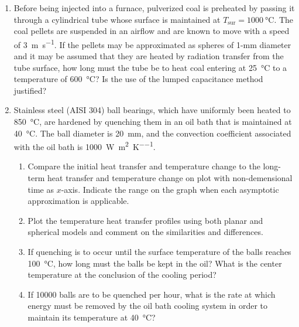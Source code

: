 \documentclass[12pt,letterpaper]{article}
\begin{document}
\begin{enumerate}
    \item Before being injected into a furnace, pulverized coal is preheated by passing it through a cylindrical tube whose surface is maintained at $T_{\mathrm{sur}} = \SI{1000}{\celsius}$.
    The coal pellets are suspended in an airflow and are known to move with a speed of \SI{3}{\meter\per\second}.
       If the pellets may be approximated as spheres of 1-mm diameter and it may be assumed that they are heated by radiation transfer from the tube surface, how long must the tube be to heat coal entering at \SI{25}{\celsius} to a temperature of \SI{600}{\celsius}?
        Is the use of the lumped capacitance method justified?
        
        \item Stainless steel (AISI 304) ball bearings, which have uniformly been heated to \SI{850}{\celsius}, are hardened by quenching them in an oil bath that is maintained at \SI{40}{\celsius}.
        The ball diameter is \SI{20}{\milli\meter}, and the convection coefficient associated with the oil bath is \SI{1000}{\watt\per\square\meter\per\kelvin}.
        \begin{enumerate}
        		\item Compare the initial heat transfer and temperature change to the long-term heat transfer and temperature change on plot with non-demensional time as $x$-axis.
		Indicate the range on the graph when each asymptotic approximation is applicable.
		\item Plot the temperature heat transfer profiles using both planar and spherical models and comment on the similarities and differences. 
        		\item If quenching is to occur until the surface temperature of the balls reaches \SI{100}{\celsius}, how long must the balls be kept in the oil? What is the center temperature at the conclusion of the cooling period?
		\item If \num{10000} balls are to be quenched per hour, what is the rate at which energy must be removed by the oil bath cooling system in order to maintain its temperature at \SI{40}{\celsius}?
	\end{enumerate}



\end{enumerate}
\end{document}

